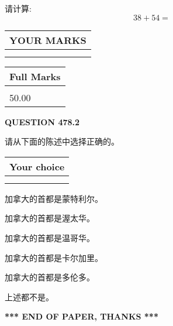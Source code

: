 \documentclass{ctexart}
\begin{document}
  
 
请计算:
\begin{equation}
38 +  %
54 = \nonumber
\end{equation}
 

 

 
  
\vspace{0.2in}
  
\noindent\begin{tabular}{|l|}
\hline
 YOUR MARKS  \\
\hline
 \\ 
 \\ 
\hline
\end{tabular}
\hspace{0.05in} \begin{tabular}{|l|}
\hline
 Full Marks  \\
\hline
 \\ 
50.00 \\
\hline
\end{tabular}
{\textbf{\Large{QUESTION
478.2 
}}}
  
  
请从下面的陈述中选择正确的。
  
  
\noindent\hspace{3.0in} \begin{tabular}{|l|}
\hline
Your choice \\
\hline
 \\ 
 \\ 
\hline
\end{tabular}
  
  
 
 
加拿大的首都是蒙特利尔。
 
 
加拿大的首都是渥太华。
 
 
加拿大的首都是温哥华。
 
 
加拿大的首都是卡尔加里。
 
 
加拿大的首都是多伦多。
 
 
 上述都不是。
 
 
   
   
 \vspace{0.2in}
 
   
   
   
   
\vspace{1.0in} 
{\textbf{\large{ *** END OF PAPER, THANKS *** }}} 
   
\end{document}
